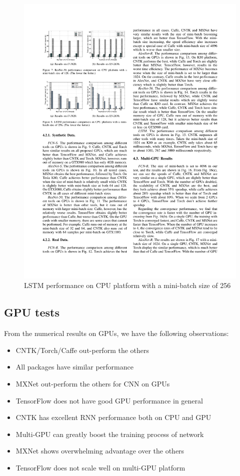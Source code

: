 \documentclass[11pt, oneside]{article}   	%
\begin{document}
\begin{figure}[htbp] 
	\includegraphics[width=\linewidth]{figures/LSTM1.pdf} 
	\caption{LSTM performance on CPU platform with a mini-batch size of 256}
\end{figure}

\subsection{GPU tests}

From the numerical results on GPUs, we have the following observations:
\begin{itemize}
\item CNTK/Torch/Caffe out-perform the others
\item All packages have similar performance
\item MXNet out-perform the others for CNN on GPUs
\item TensorFlow does not have good GPU performance in general
\item CNTK has excellent RNN performance both on CPU and GPU
\item Multi-GPU can greatly boost the training process of network
\item MXNet shows overwhelming advantage over the others
\item TensorFlow does not scale well on multi-GPU platform
\end{itemize}
\end{document}
